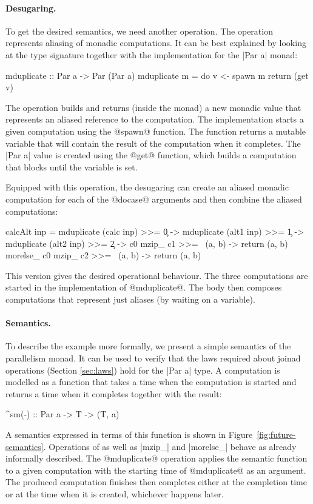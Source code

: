 \documentclass[preprint]{sigplanconf}
\begin{document}
\paragraph{Desugaring.} To get the desired semantics, we need another operation. The operation
represents aliasing of monadic computations. It can be best explained by looking at the type 
signature together with the implementation for the |Par a| monad:

\begin{code}
mduplicate :: Par a -> Par (Par a)
mduplicate m = do 
  v <- spawn m
  return (get v)
\end{code}
The operation builds and returns (inside the monad) a new monadic value that represents 
an aliased reference to the computation. The implementation starts a given computation 
using the @spawn@ function. The function returns a mutable variable that will contain the result 
of the computation when it completes. The |Par a| value is created using the @get@ function,
which builds a computation that blocks until the variable is set.

Equipped with this operation, the desugaring can create an aliased monadic computation for each
of the @docase@ arguments and then combine the aliased computations:

\begin{code}
calcAlt inp = 
  mduplicate (calc inp) >>= \c0 ->
  mduplicate (alt1 inp) >>= \c1 ->
  mduplicate (alt2 inp) >>= \c2 ->
  c0 mzip_ c1 >>= \ (a, b) -> return (a, b) morelse_
  c0 mzip_ c2 >>= \ (a, b) -> return (a, b)
\end{code}
This version gives the desired operational behaviour. The three computations are started in 
the implementation of @mduplicate@. The body then composes computations that represent
just aliases (by waiting on a variable).

\paragraph{Semantics.} To describe the example more formally, we present a simple semantics
of the parallelism monad. It can be used to verify that the laws required about joinad operations 
(Section \ref{sec:laws}) hold for the |Par a| type. A computation is modelled as a function that
takes a time when the computation is started and returns a time when it completes together with
the result:

\begin{code}
^sm(-) :: Par a -> T -> (T, a)
\end{code}
A semantics expressed in terms of this function is shown in Figure~\ref{fig:future-semantics}.
Operations of  as well as |mzip_| and |morelse_| behave as already informally described.
The @mduplicate@ operation applies the semantic function to a given computation with the starting 
time of @mduplicate@ as an argument. The produced computation finishes then completes either at 
the completion time or at the time when it is created, whichever happens later.
\end{document}

